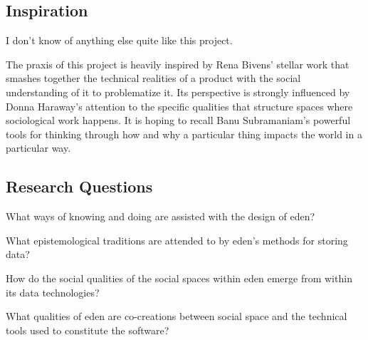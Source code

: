 \documentclass[a4paper,man,natbib]{apa6}
\begin{document}
   \subsection*{Inspiration}
   I don't know of anything else quite like this project.

   The praxis of this project is heavily inspired by Rena Bivens' stellar work that smashes together the technical realities of a product with the social understanding of it to problematize it. Its perspective is strongly influenced by Donna Haraway's attention to the specific qualities  that structure spaces where sociological work happens. It is hoping to recall Banu Subramaniam's powerful tools for thinking through how and why a particular thing impacts the world in a particular way.

   \subsection*{Research Questions}
   What ways of knowing and doing are assisted with the design of \acrshort{eden}?

   What epistemological traditions are attended to by \acrshort{eden}'s methods for storing data? 

   How do the social qualities of the social spaces within \acrshort{eden} emerge from within its data technologies?

   What qualities of \acrshort{eden} are co-creations between social space and the technical tools used to constitute the software?
\end{document}
